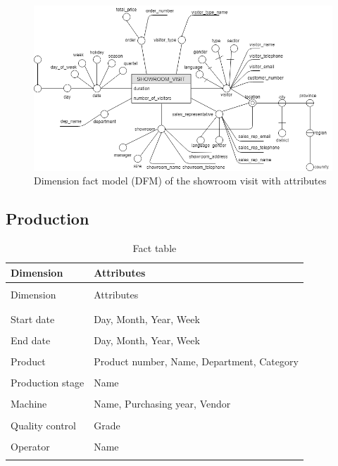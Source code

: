 \documentclass[letterpaper,12pt]{article}
\begin{document}
\begin{figure}[H] 
        \centering
        \includegraphics[width=\columnwidth]{../images/DFM_Showroom.png}
        \caption{
                \label{fig:showroomAttributes}  
                Dimension fact model (DFM) of the showroom visit with attributes 
        }
\end{figure}

\subsection{Production}

\begingroup
\renewcommand\arraystretch{0.5}
\begin{longtable}{p{4cm}p{9cm}}
        \caption{Fact table} \\
        Dimension & Attributes \\
        \endfirsthead \\
        Dimension & Attributes \\
        \endhead \\
        \hline \\
        Start date & Day, Month, Year, Week \\
        \hline \\
        End date & Day, Month, Year, Week \\
        \hline \\
        Product & Product number, Name, Department, Category \\
        \hline \\
        Production stage & Name \\
        \hline \\
        Machine & Name, Purchasing year, Vendor \\
        \hline \\
        Quality control & Grade \\
        \hline \\
        Operator & Name \\
        \hline \\
\end{longtable}
\endgroup
\end{document}
